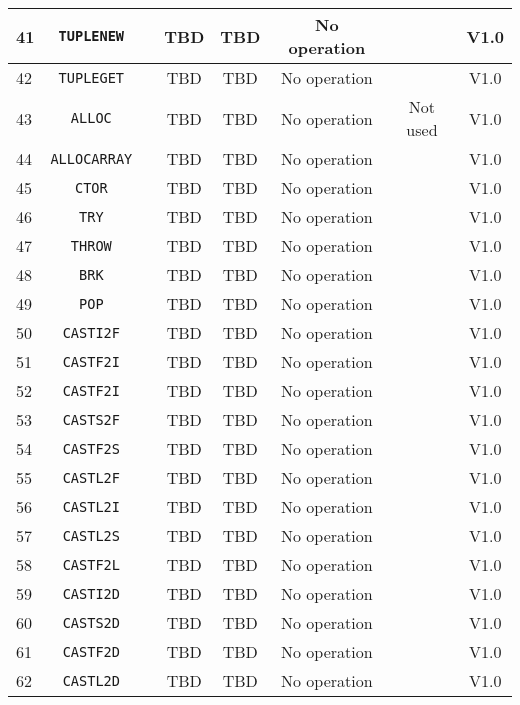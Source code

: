 \documentclass{article}
\begin{document}
\begin{longtable}{|l|c|c|c|c|c|c|c|}
		41 & \texttt{TUPLENEW} & & TBD & TBD & No operation & & \textsf{V1.0} \\ \hline
		42 & \texttt{TUPLEGET} & & TBD & TBD & No operation & & \textsf{V1.0} \\ \hline
		43 & \texttt{ALLOC} & & TBD & TBD & No operation & Not used & \textsf{V1.0} \\ \hline
		44 & \texttt{ALLOCARRAY} & & TBD & TBD & No operation & & \textsf{V1.0} \\ \hline
		45 & \texttt{CTOR} & & TBD & TBD & No operation & & \textsf{V1.0} \\ \hline
		46 & \texttt{TRY} & & TBD & TBD & No operation & & \textsf{V1.0} \\ \hline
		47 & \texttt{THROW} & & TBD & TBD & No operation & & \textsf{V1.0} \\ \hline
		48 & \texttt{BRK} & & TBD & TBD & No operation & & \textsf{V1.0} \\ \hline
		49 & \texttt{POP} & & TBD & TBD & No operation & & \textsf{V1.0} \\ \hline
		50 & \texttt{CASTI2F} & & TBD & TBD & No operation & & \textsf{V1.0} \\ \hline
		51 & \texttt{CASTF2I} & & TBD & TBD & No operation & & \textsf{V1.0} \\ \hline
		52 & \texttt{CASTF2I} & & TBD & TBD & No operation & & \textsf{V1.0} \\ \hline
		53 & \texttt{CASTS2F} & & TBD & TBD & No operation & & \textsf{V1.0} \\ \hline
		54 & \texttt{CASTF2S} & & TBD & TBD & No operation & & \textsf{V1.0} \\ \hline
		55 & \texttt{CASTL2F} & & TBD & TBD & No operation & & \textsf{V1.0} \\ \hline
		56 & \texttt{CASTL2I} & & TBD & TBD & No operation & & \textsf{V1.0} \\ \hline
		57 & \texttt{CASTL2S} & & TBD & TBD & No operation & & \textsf{V1.0} \\ \hline
		58 & \texttt{CASTF2L} & & TBD & TBD & No operation & & \textsf{V1.0} \\ \hline
		59 & \texttt{CASTI2D} & & TBD & TBD & No operation & & \textsf{V1.0} \\ \hline
		60 & \texttt{CASTS2D} & & TBD & TBD & No operation & & \textsf{V1.0} \\ \hline
		61 & \texttt{CASTF2D} & & TBD & TBD & No operation & & \textsf{V1.0} \\ \hline
		62 & \texttt{CASTL2D} & & TBD & TBD & No operation & & \textsf{V1.0} \\ \hline

\end{longtable}
\end{document}
